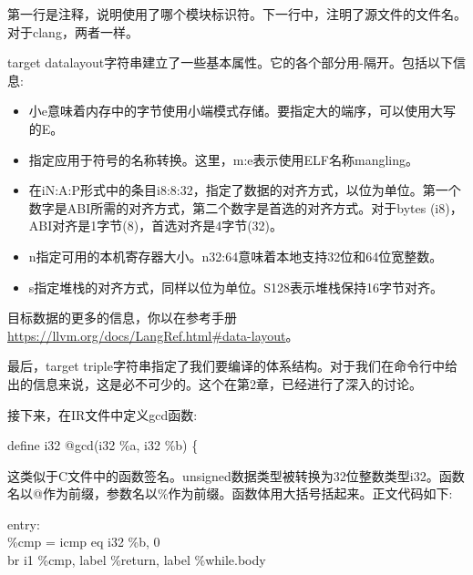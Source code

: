 第一行是注释，说明使用了哪个模块标识符。下一行中，注明了源文件的文件名。对于clang，两者一样。\par

target datalayout字符串建立了一些基本属性。它的各个部分用-隔开。包括以下信息:\par

\begin{itemize}
\item 小e意味着内存中的字节使用小端模式存储。要指定大的端序，可以使用大写的E。
\item 指定应用于符号的名称转换。这里，m:e表示使用ELF名称mangling。
\item 在iN:A:P形式中的条目i8:8:32，指定了数据的对齐方式，以位为单位。第一个数字是ABI所需的对齐方式，第二个数字是首选的对齐方式。对于bytes (i8)， ABI对齐是1字节(8)，首选对齐是4字节(32)。
\item n指定可用的本机寄存器大小。n32:64意味着本地支持32位和64位宽整数。
\item s指定堆栈的对齐方式，同样以位为单位。S128表示堆栈保持16字节对齐。
\end{itemize}

\begin{tcolorbox}[colback=blue!5!white,colframe=blue!75!black,title=Note]
目标数据的更多的信息，你以在参考手册\url{https://llvm.org/docs/LangRef.html#data-layout}。
\end{tcolorbox}

最后，target triple字符串指定了我们要编译的体系结构。对于我们在命令行中给出的信息来说，这是必不可少的。这个在第2章，已经进行了深入的讨论。\par

接下来，在IR文件中定义gcd函数:\par

\begin{tcolorbox}[colback=white,colframe=black]
define i32 @gcd(i32 \%a, i32 \%b) \{
\end{tcolorbox}

这类似于C文件中的函数签名。unsigned数据类型被转换为32位整数类型i32。函数名以@作为前缀，参数名以\%作为前缀。函数体用大括号括起来。正文代码如下:\par

\begin{tcolorbox}[colback=white,colframe=black]
entry: \\
\hspace*{0.5cm}\%cmp = icmp eq i32 \%b, 0 \\
\hspace*{0.5cm}br i1 \%cmp, label \%return, label \%while.body
\end{tcolorbox}

